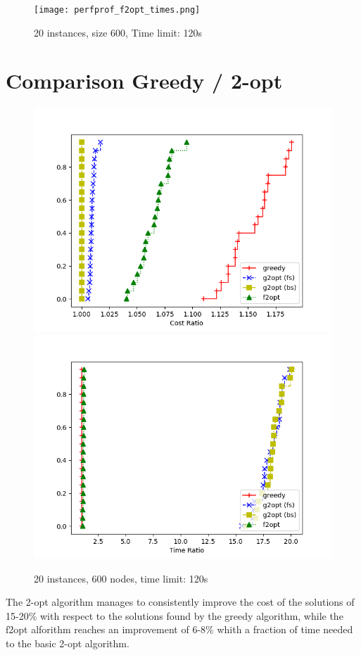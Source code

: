 \begin{figure}[h]
    \centering
    \texttt{[image: perfprof\_f2opt\_times.png]}
    \caption*{20 instances, size 600, Time limit: 120s}
\end{figure}

\newpage 

\section{Comparison Greedy / 2-opt}

\begin{figure}[h]
    \centering
    \includegraphics*[width=.45\textwidth]{../plots/perfprof_heur_costs.png}
    \includegraphics*[width=.45\textwidth]{../plots/perfprof_heur_times.png}
    \caption*{20 instances, 600 nodes, time limit: 120s}
\end{figure}

The 2-opt algorithm manages to consistently improve the cost of the solutions of 15-20\% with respect to the solutions found by the greedy algorithm, while the f2opt alforithm reaches an improvement of 6-8\% whith a fraction of time needed to the basic 2-opt algorithm.